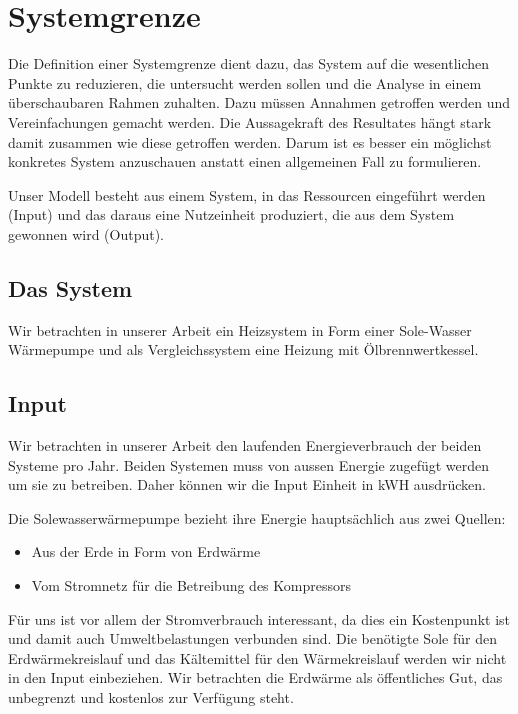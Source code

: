\chapter{Systemgrenze}
\label{chap:Systemgrenze}

Die Definition einer Systemgrenze dient dazu, das System auf die wesentlichen
Punkte zu reduzieren, die untersucht werden sollen und die Analyse in einem
überschaubaren Rahmen zuhalten.
Dazu müssen Annahmen getroffen werden und Vereinfachungen gemacht werden.
Die Aussagekraft des Resultates hängt stark damit zusammen wie diese getroffen
werden. Darum ist es besser ein möglichst konkretes System anzuschauen anstatt
einen allgemeinen Fall zu formulieren.

Unser Modell besteht aus einem System, in das Ressourcen eingeführt werden
(Input) und das daraus eine Nutzeinheit produziert, die aus dem System gewonnen
wird (Output).

\section{Das System}

Wir betrachten in unserer Arbeit ein Heizsystem in Form einer
Sole-Wasser Wärmepumpe und als Vergleichssystem eine Heizung mit
Ölbrennwertkessel.

\section{Input}

Wir betrachten in unserer Arbeit den laufenden Energieverbrauch der beiden
Systeme pro Jahr.
Beiden Systemen muss von aussen Energie zugefügt werden um sie zu betreiben.
Daher können wir die Input Einheit in kWH ausdrücken.

Die Solewasserwärmepumpe bezieht ihre Energie hauptsächlich aus zwei Quellen:
\begin{itemize}
\item Aus der Erde in Form von Erdwärme
\item Vom Stromnetz für die Betreibung des Kompressors
\end{itemize}

Für uns ist vor allem der Stromverbrauch interessant, da dies ein Kostenpunkt
ist und damit auch Umweltbelastungen verbunden sind. Die benötigte Sole für den Erdwärmekreislauf und das Kältemittel für den Wärmekreislauf werden wir nicht in den Input einbeziehen. Wir betrachten die Erdwärme als öffentliches Gut, das unbegrenzt und kostenlos zur Verfügung steht.

